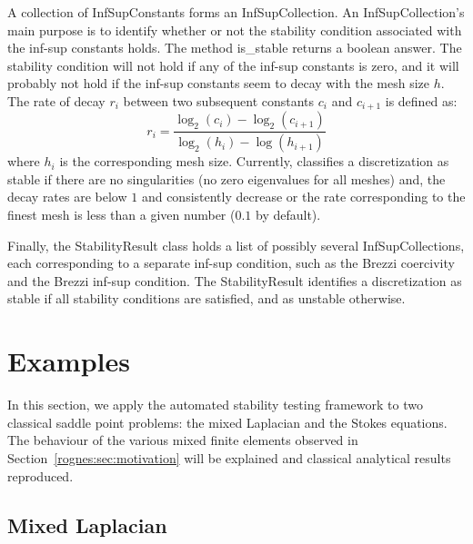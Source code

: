 A collection of \textrm{InfSupConstant}s forms an
\textrm{InfSupCollection}. An \textrm{InfSupCollection}'s main purpose
is to identify whether or not the stability condition associated with
the inf-sup constants holds. The method \textrm{is\_stable} returns a
boolean answer. The stability condition will not hold if any of the
inf-sup constants is zero, and it will probably not hold if the
inf-sup constants seem to decay with the mesh size $h$.  The rate of
decay $r_i$ between two subsequent constants $c_i$ and $c_{i+1}$ is
defined as:
\begin{equation*}
  r_i = \frac{\log_2(c_i) - \log_2(c_{i+1})}{\log_2(h_i) -
    \log(h_{i+1})}
\end{equation*}
where $h_i$ is the corresponding mesh size. Currently, \ascot{}
classifies a discretization as stable if there are no singularities
(no zero eigenvalues for all meshes) and, the decay rates are below
$1$ and consistently decrease or the rate corresponding to the finest
mesh is less than a given number ($0.1$ by default).

Finally, the \textrm{StabilityResult} class holds a list of possibly
several \textrm{InfSupCollections}, each corresponding to a separate
inf-sup condition, such as the Brezzi coercivity and the Brezzi
inf-sup condition. The \textrm{StabilityResult} identifies a
discretization as stable if all stability conditions are satisfied,
and as unstable otherwise.

\section{Examples}
\label{rognes:sec:examples}

In this section, we apply the automated stability testing framework to
two classical saddle point problems: the mixed Laplacian and the
Stokes equations. The behaviour of the various mixed finite elements
observed in Section~\ref{rognes:sec:motivation} will be explained and
classical analytical results reproduced.

\subsection{Mixed Laplacian}

